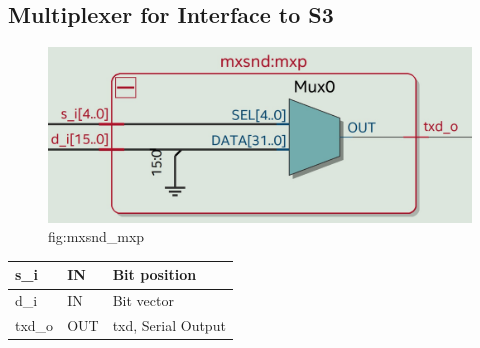 \documentclass[12pt,a4 paper] {article}
\begin{document}
\subsection{Multiplexer for Interface to S3}
\begin{figure}[h]
	\centering	
	\includegraphics[scale=0.2]{../png/mxsnd_mxp.png}
	\newline
	fig:mxsnd\_mxp\\
\end{figure}
\begin{center}
	\begin{tabular}{| p{2cm} | p{2cm} | p{4cm} |}
		\hline
		s\_i  & IN & Bit position\\
		\hline
		d\_i   & IN  &  Bit vector\\
		\hline	
		txd\_o & OUT & txd, Serial Output\\
		\hline
		
	\end{tabular}
\end{center}
\newpage
\end{document}
